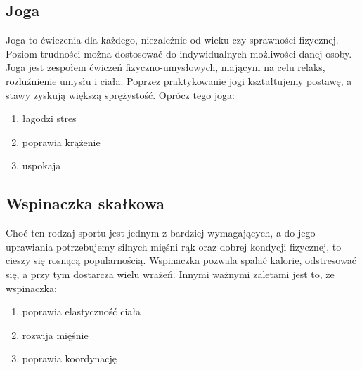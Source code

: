 \documentclass[12pt, letterpaper, titlepage]{article}
\begin{document}
\subsection*{Joga}
Joga to ćwiczenia dla każdego, niezależnie od wieku czy sprawności fizycznej. Poziom trudności można dostosować do indywidualnych możliwości danej osoby. Joga jest zespołem ćwiczeń fizyczno-umysłowych, mającym na celu relaks, rozluźnienie umysłu i ciała. Poprzez praktykowanie jogi kształtujemy postawę, a stawy zyskują większą sprężystość.
\newline
Oprócz tego joga:
\begin{enumerate}[-]
\item łagodzi stres
\item poprawia krążenie
\item uspokaja
\end{enumerate}
\subsection*{Wspinaczka skałkowa}
Choć ten rodzaj sportu jest jednym z bardziej wymagających, a do jego uprawiania potrzebujemy silnych mięśni rąk oraz dobrej kondycji fizycznej, to cieszy się rosnącą popularnością. Wspinaczka pozwala spalać kalorie, odstresować się, a przy tym dostarcza wielu wrażeń. Innymi ważnymi zaletami jest to, że wspinaczka:
\begin{enumerate}[-]
\item poprawia elastyczność ciała
\item rozwija mięśnie
\item poprawia koordynację
\end{enumerate}
\end{document}
